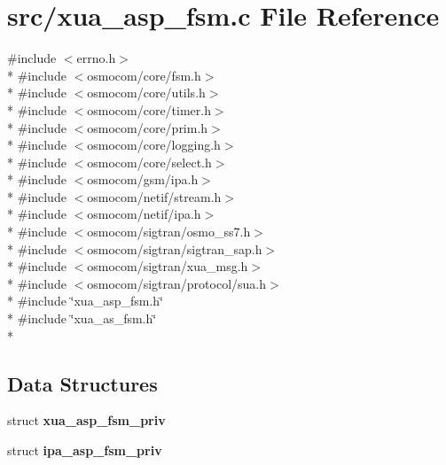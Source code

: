 \section{src/xua\+\_\+asp\+\_\+fsm.c File Reference}
\label{xua__asp__fsm_8c}
{\ttfamily \#include $<$errno.\+h$>$}\\*
{\ttfamily \#include $<$osmocom/core/fsm.\+h$>$}\\*
{\ttfamily \#include $<$osmocom/core/utils.\+h$>$}\\*
{\ttfamily \#include $<$osmocom/core/timer.\+h$>$}\\*
{\ttfamily \#include $<$osmocom/core/prim.\+h$>$}\\*
{\ttfamily \#include $<$osmocom/core/logging.\+h$>$}\\*
{\ttfamily \#include $<$osmocom/core/select.\+h$>$}\\*
{\ttfamily \#include $<$osmocom/gsm/ipa.\+h$>$}\\*
{\ttfamily \#include $<$osmocom/netif/stream.\+h$>$}\\*
{\ttfamily \#include $<$osmocom/netif/ipa.\+h$>$}\\*
{\ttfamily \#include $<$osmocom/sigtran/osmo\+\_\+ss7.\+h$>$}\\*
{\ttfamily \#include $<$osmocom/sigtran/sigtran\+\_\+sap.\+h$>$}\\*
{\ttfamily \#include $<$osmocom/sigtran/xua\+\_\+msg.\+h$>$}\\*
{\ttfamily \#include $<$osmocom/sigtran/protocol/sua.\+h$>$}\\*
{\ttfamily \#include \char`\"{}xua\+\_\+asp\+\_\+fsm.\+h\char`\"{}}\\*
{\ttfamily \#include \char`\"{}xua\+\_\+as\+\_\+fsm.\+h\char`\"{}}\\*
\subsection*{Data Structures}
\begin{DoxyCompactItemize}
\item 
struct {\bf xua\+\_\+asp\+\_\+fsm\+\_\+priv}
\item 
struct {\bf ipa\+\_\+asp\+\_\+fsm\+\_\+priv}
\end{DoxyCompactItemize}
